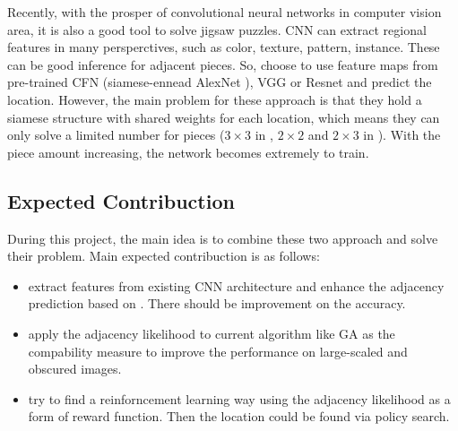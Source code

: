 \documentclass{article}
\begin{document}
Recently, with the prosper of convolutional neural networks in computer vision area, it is also a good tool to solve jigsaw puzzles. CNN can extract regional features in many persperctives, such as color, texture, pattern, instance. These can be good inference for adjacent pieces. So, \cite{deryneural,noroozi2016unsupervised} choose to use feature maps from pre-trained CFN \cite{noroozi2016unsupervised} (siamese-ennead AlexNet \cite{krizhevsky2012imagenet}), VGG \cite{he2016deep} or Resnet \cite{simonyan2014very} and predict the location. However, the main problem for these approach is that they hold a siamese structure with shared weights for each location, which means they can only solve a limited number for pieces ($3\times3$ in \cite{noroozi2016unsupervised}, $2\times2$ and $2\times3$ in \cite{deryneural}). With the piece amount increasing, the network becomes extremely to train.

\subsection{Expected Contribuction}

During this project, the main idea is to combine these two approach and solve their problem. Main expected contribuction is as follows:

\begin{itemize}
    \item extract features from existing CNN architecture and enhance the adjacency prediction based on \cite{sholomon2016dnn}. There should be improvement on the accuracy.
    \item apply the adjacency likelihood to current algorithm like GA as the compability measure to improve the performance on large-scaled and obscured images.
    \item try to find a reinforncement learning way using the adjacency likelihood as a form of reward function. Then the location could be found via policy search.
\end{itemize}



\end{document}
